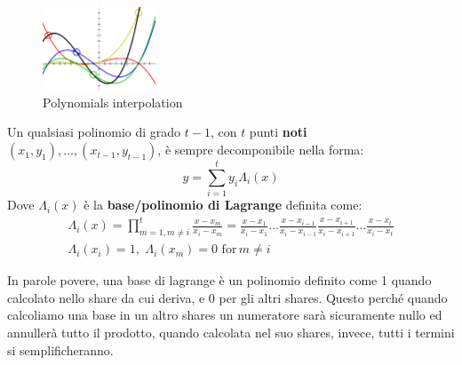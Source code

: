 \begin{corollary}\begin{figure}
  \vspace{-20pt}
  \begin{center}
    \includegraphics[width=0.3\textwidth]{image/secret_sharing/poly.png}
  \end{center}
  \caption{Polynomials interpolation}
    \label{fig:polyinter}
  \vspace{-10pt}
\end{figure}
Un qualsiasi polinomio di grado $t-1$, con $t$ punti \textbf{noti} $(x_1,y_1),\dots,(x_{t-1},y_{t-1})$, è sempre decomponibile nella forma:
\begin{equation}\label{eq:lagrangeinter}
    y=\sum_{i=1}^{t}y_i\Lambda_i(x)
\end{equation}
Dove $\Lambda_i(x)$ è la \textbf{base/polinomio di Lagrange} definita come:
\begin{equation}
    \begin{gathered}\label{eq:lagrangebase}
    \Lambda_i(x)  = \prod_{m=1,m\ne i}^{t}\frac{x-x_m}{x_i-x_m}=\frac{x-x_1}{x_i-x_1}\dots\frac{x-x_{i-1}}{x_i-x_{i-1}}\frac{x-x_{i+1}}{x_i-x_{i+1}}\dots\frac{x-x_t}{x_i-x_t}\\
    \Lambda_i(x_i) = 1,\,\,\Lambda_i(x_m)=0\,\,\text{for}\,m\ne i
\end{gathered}
\end{equation}
\end{corollary}
\begin{remark}
In parole povere, una base di lagrange è un polinomio definito come 1 quando calcolato nello share da cui deriva, e 0 per gli altri shares. Questo perché quando calcoliamo una base in un altro shares un numeratore sarà sicuramente nullo ed annullerà tutto il prodotto, quando calcolata nel suo shares, invece, tutti i termini si semplificheranno.
\end{remark}
